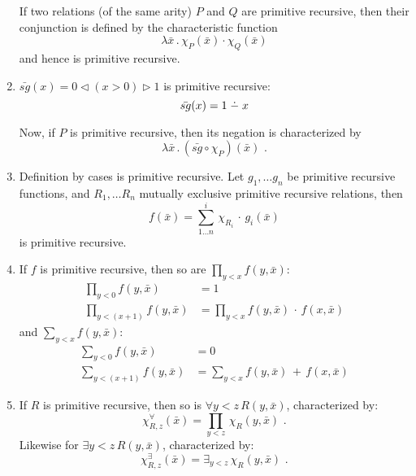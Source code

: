 \documentclass[a4paper,11pt]{article}
\newcommand{\dotmin}{\buildrel\textstyle.\over{\hbox{\vrule height3pt depth0pt width0pt}{\smash-}}}
\begin{document}
\begin{enumerate}
If two relations (of the same arity) $P$ and $Q$ are primitive recursive, then
their conjunction is defined by the characteristic function
\begin{equation*}
  \lambda \bar{x} \, . \, \chi_{P}(\bar{x}) \cdot \chi_{Q}(\bar{x})
\end{equation*}
and hence is primitive recursive.


\item %
$\bar{sg}(x) = 0 \lhd (x > 0) \rhd 1$ is primitive recursive:
\begin{equation*}
  \bar{sg}(x) = 1 \dotmin x
\end{equation*}

Now, if $P$ is primitive recursive, then its negation is characterized by
\begin{equation*}
 \lambda \bar{x} \, . \, (\bar{sg} \circ \chi_P) (\bar{x}) \text{ .}
\end{equation*}


\item %
Definition by cases is primitive recursive. Let $g_1, \ldots g_n$ be primitive
recursive functions, and $R_1, \ldots R_n$ mutually exclusive primitive
recursive relations, then
\begin{equation*}
  f(\bar{x}) = \sum^i_{1 \ldots n} \, \chi_{R_i} \, \cdot \, g_i(\bar{x})
\end{equation*}
is primitive recursive.


\item %
If $f$ is primitive recursive, then so are $\prod_{y < x} f(y, \bar{x})$:
\begin{align*}
  \textstyle{\prod_{y < 0}} f(y, \bar{x})     &= 1\\
  \textstyle{\prod_{y < (x + 1)}} f(y, \bar{x}) &= \textstyle{\prod_{y < x}} f(y, \bar{x}) \, \cdot \, f(x, \bar{x})
\end{align*}
and $\sum_{y < x} f(y, \bar{x})$:
\begin{align*}
  \textstyle{\sum_{y < 0}} f(y, \bar{x})     &= 0\\
  \textstyle{\sum_{y < (x + 1)}} f(y, \bar{x}) &= \textstyle{\sum_{y < x}} f(y, \bar{x}) \, + \, f(x, \bar{x})
\end{align*}


\item %
If $R$ is primitive recursive, then so is $\forall y \! < \! z \, R(y, \bar{x})$, characterized by:
\begin{equation*}
  \chi^{\forall}_{R,z}(\bar{x}) = \textstyle{\prod_{y < z}} \, \chi_R(y, \bar{x}) \text{ .}
\end{equation*}
Likewise for $\exists y \! < \! z \, R(y, \bar{x})$, characterized by:
\begin{equation*}
  \chi^{\exists}_{R,z}(\bar{x}) = \textstyle{\exists_{y < z}} \, \chi_R(y, \bar{x}) \text{ .}
\end{equation*}


\end{enumerate}
\end{document}
